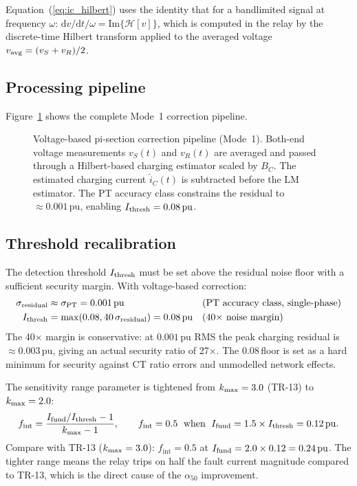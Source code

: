 \documentclass[11pt,a4paper]{article}
\newcommand{\fint}{f_{\mathrm{int}}}
\newcommand{\alphafifty}{\alpha_{50}}
\newcommand{\BC}{B_C}
\newcommand{\pu}{\,\text{pu}}
\begin{document}
Equation~(\ref{eq:ic_hilbert}) uses the identity that for a bandlimited
signal at frequency $\omega$: $\mathrm{d}v/\mathrm{d}t / \omega =
\mathrm{Im}\{\mathcal{H}[v]\}$, which is computed in the relay by the
discrete-time Hilbert transform applied to the averaged voltage
$v_{\rm avg} = (v_S + v_R)/2$.

\subsection{Processing pipeline}

Figure~\ref{fig:block} shows the complete Mode~1 correction pipeline.

\begin{figure}[h]
  \centering
  \resizebox{\textwidth}{!}{%
  }
  \caption{Voltage-based pi-section correction pipeline (Mode~1).  Both-end
           voltage measurements $v_S(t)$ and $v_R(t)$ are averaged and passed
           through a Hilbert-based charging estimator scaled by $\BC$.  The
           estimated charging current $\hat{i}_C(t)$ is subtracted before the
           LM estimator.  The PT accuracy class constrains the residual to
           $\approx 0.001\pu$, enabling $I_{\rm thresh} = 0.08\pu$.}
  \label{fig:block}
\end{figure}

\subsection{Threshold recalibration}

The detection threshold $I_{\rm thresh}$ must be set above the residual
noise floor with a sufficient security margin.  With voltage-based correction:
\begin{align}
  \sigma_{\rm residual} &\approx \sigma_{\rm PT} = 0.001\pu
    && \text{(PT accuracy class, single-phase)}
    \label{eq:residual_sigma}\\
  I_{\rm thresh} &= \max\!\left(0.08, 40\,\sigma_{\rm residual}\right)
                  = 0.08\pu
    && \text{(40$\times$ noise margin)}
    \label{eq:thresh}
\end{align}
The 40$\times$ margin is conservative: at $0.001\pu$ RMS the peak charging
residual is $\approx 0.003\pu$, giving an actual security ratio of 27$\times$.
The 0.08\pu floor is set as a hard minimum for security against CT ratio
errors and unmodelled network effects.

The sensitivity range parameter is tightened from $k_{\rm max} = 3.0$ (TR-13)
to $k_{\rm max} = 2.0$:
\begin{equation}
  \fint = \frac{I_{\rm fund}/I_{\rm thresh} - 1}{k_{\rm max} - 1},
  \qquad
  \fint = 0.5 \;\text{ when }\; I_{\rm fund} = 1.5 \times I_{\rm thresh}
        = 0.12\pu.
  \label{eq:fint}
\end{equation}
Compare with TR-13 ($k_{\rm max} = 3.0$): $\fint = 0.5$ at
$I_{\rm fund} = 2.0 \times 0.12 = 0.24\pu$.
The tighter range means the relay trips on half the fault current magnitude
compared to TR-13, which is the direct cause of the $\alphafifty$ improvement.
\end{document}

